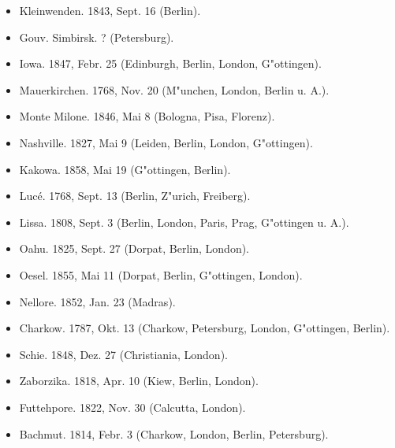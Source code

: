 \documentclass[a4paper, 11pt, oneside]{article}
\begin{document}
\begin{itemize}
\begin{itemize}
\begin{itemize}
            \item Kleinwenden. 1843, Sept. 16 (Berlin).
        
            \item Gouv. Simbirsk. ? (Petersburg).
        
            \item Iowa. 1847, Febr. 25 (Edinburgh, Berlin, London, G"ottingen).
        
            \item Mauerkirchen. 1768, Nov. 20 (M"unchen, London, Berlin u. A.).
        
            \item Monte Milone. 1846, Mai 8 (Bologna, Pisa, Florenz).
        
            \item Nashville. 1827, Mai 9 (Leiden, Berlin, London, G"ottingen).
        
            \item Kakowa. 1858, Mai 19 (G"ottingen, Berlin).
        
            \item Lucé. 1768, Sept. 13 (Berlin, Z"urich, Freiberg).
        
            \item Lissa. 1808, Sept. 3 (Berlin, London, Paris, Prag, G"ottingen u. A.).
        
            \item Oahu. 1825, Sept. 27 (Dorpat, Berlin, London).
        
            \item Oesel. 1855, Mai 11 (Dorpat, Berlin, G"ottingen, London).
        
            \item Nellore. 1852, Jan. 23 (Madras).
        
            \item Charkow. 1787, Okt. 13 (Charkow, Petersburg, London, G"ottingen, Berlin).
        
            \item Schie. 1848, Dez. 27 (Christiania, London).
        
            \item Zaborzika. 1818, Apr. 10 (Kiew, Berlin, London).
        
            \item Futtehpore. 1822, Nov. 30 (Calcutta, London).
        
            \item Bachmut. 1814, Febr. 3 (Charkow, London, Berlin, Petersburg).
        

\end{itemize}
\end{itemize}
\end{itemize}
\end{document}

